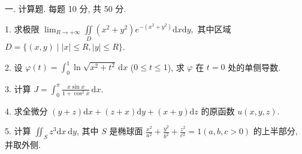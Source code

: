 \documentclass{examcollection}
\begin{document}
{\begin{minipage}{\textwidth}
\smallskip
一. 计算题. 每题 10 分, 共 50 分.\par
1. 求极限 $\lim_{R\to +\infty}\iint \limits_{D}(x^{2} + y^{2})e^{-(x^{2} + y^{2})}\mathrm{d}x\mathrm{d}y,$ 其中区域 $D = \{(x,y)\mid |x|\leq R,|y|\leq R\}$.\par
2. 设 $\varphi(t) = \int_0^1 \ln \sqrt{x^2 + t^2} \, \mathrm{d}x$ ($0 \leq t \leq 1$), 求 $\varphi$ 在 $t = 0$ 处的单侧导数.\par
3. 计算 $J = \int_{0}^{\pi} \frac{x \sin x}{1 + \cos^{2} x} \, \mathrm{d}x$.\par
4. 求全微分 $(y + z)\mathrm{d}x + (z + x)\mathrm{d}y + (x + y)\mathrm{d}z$ 的原函数 $u(x,y,z)$.\par
5. 计算 $\iint_{S} z^{3} \mathrm{d}x \mathrm{~d}y$, 其中 $S$ 是椭球面 $\frac{x^{2}}{a^{2}} + \frac{y^{2}}{b^{2}} + \frac{z^{2}}{c^{2}} = 1 (a, b, c > 0)$ 的上半部分, 并取外侧.\par
\end{minipage}}
\ifdim\dimexpr\ht\proofbox+\dp\proofbox\relax>\textheight
\noindent\resizebox{!}{\textheight}{\usebox{\proofbox}}\else\noindent\usebox{\proofbox}\fi\clearpage
\end{document}
